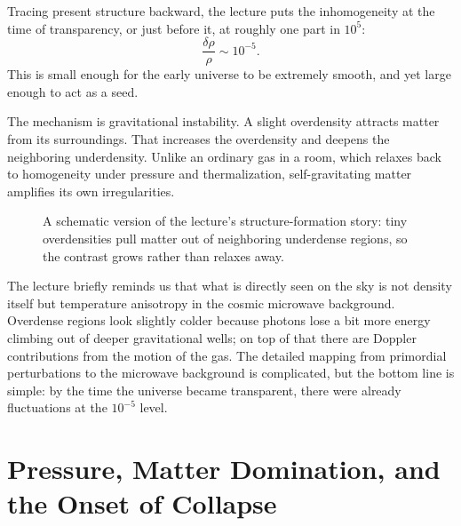 Tracing present structure backward, the lecture puts the inhomogeneity at the time of transparency, or just before it, at roughly one part in \(10^5\):
\begin{equation}
\frac{\delta\rho}{\rho}\sim 10^{-5}.
\end{equation}
This is small enough for the early universe to be extremely smooth, and yet large enough to act as a seed.

The mechanism is gravitational instability. A slight overdensity attracts matter from its surroundings. That increases the overdensity and deepens the neighboring underdensity. Unlike an ordinary gas in a room, which relaxes back to homogeneity under pressure and thermalization, self-gravitating matter amplifies its own irregularities.

\begin{figure}[t]
\centering
{}
\caption{A schematic version of the lecture's structure-formation story: tiny overdensities pull matter out of neighboring underdense regions, so the contrast grows rather than relaxes away.}
\end{figure}

The lecture briefly reminds us that what is directly seen on the sky is not density itself but temperature anisotropy in the cosmic microwave background. Overdense regions look slightly colder because photons lose a bit more energy climbing out of deeper gravitational wells; on top of that there are Doppler contributions from the motion of the gas. The detailed mapping from primordial perturbations to the microwave background is complicated, but the bottom line is simple: by the time the universe became transparent, there were already fluctuations at the \(10^{-5}\) level.

\section{Pressure, Matter Domination, and the Onset of Collapse}

